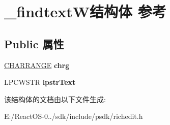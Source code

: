 \hypertarget{struct__findtext_w}{}\section{\+\_\+findtext\+W结构体 参考}
\label{struct__findtext_w}
\subsection*{Public 属性}
\begin{DoxyCompactItemize}
\item 
\mbox{\label{struct__findtext_w_a640cc177d55e35a9ff23c62b919e4b15}} 
\hyperlink{struct__charrange}{C\+H\+A\+R\+R\+A\+N\+GE} {\bfseries chrg}
\item 
\mbox{\label{struct__findtext_w_a9630fac254dc21a41afe75005fbed8af}} 
L\+P\+C\+W\+S\+TR {\bfseries lpstr\+Text}
\end{DoxyCompactItemize}


该结构体的文档由以下文件生成\+:\begin{DoxyCompactItemize}
\item 
E\+:/\+React\+O\+S-\/0../sdk/include/psdk/richedit.\+h\end{DoxyCompactItemize}
